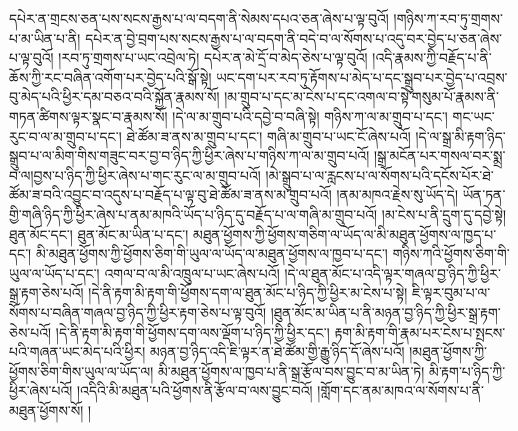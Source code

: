 དཔེར་ན་གྲངས་ཅན་པས་སངས་རྒྱས་པ་ལ་བདག་ནི་སེམས་དཔའ་ཅན་ཞེས་པ་ལྟ་བུའོ། །གཉིས་ཀ་རབ་ཏུ་གྲགས་པ་མ་ཡིན་པ་ནི། དཔེར་ན་བྱེ་བྲག་པས་སངས་རྒྱས་པ་ལ་བདག་ནི་བདེ་བ་ལ་སོགས་པ་འདུ་བར་བྱེད་པ་ཅན་ཞེས་པ་ལྟ་བུའོ། །རབ་ཏུ་གྲགས་པ་ཡང་འབྲེལ་ཏེ། དཔེར་ན་མེ་དྲོ་བ་མེད་ཅེས་པ་ལྟ་བུའོ། །འདི་རྣམས་ཀྱི་བརྗོད་པ་ནི་ཆོས་ཀྱི་རང་བཞིན་འགོག་པར་བྱེད་པའི་སྒོ་སྟེ། ཡང་དག་པར་རབ་ཏུ་རྟོགས་པ་མེད་པ་དང་སྒྲུབ་པར་བྱེད་པ་འབྲས་བུ་མེད་པའི་ཕྱིར་དམ་བཅའ་བའི་སྐྱོན་རྣམས་སོ། །མ་གྲུབ་པ་དང་མ་ངེས་པ་དང་འགལ་བ་སྟེ་གསུམ་པོ་རྣམས་ནི་གཏན་ཚིགས་ལྟར་སྣང་བ་རྣམས་སོ། །དེ་ལ་མ་གྲུབ་པའི་དབྱེ་བ་བཞི་སྟེ། གཉིས་ཀ་ལ་མ་གྲུབ་པ་དང་། གང་ཡང་རུང་བ་ལ་མ་གྲུབ་པ་དང་། ཐེ་ཚོམ་ཟ་ནས་མ་གྲུབ་པ་དང་། གཞི་མ་གྲུབ་པ་ཡང་ངོ་ཞེས་པའོ། །དེ་ལ་སྒྲ་མི་རྟག་ཉིད་སྒྲུབ་པ་ལ་མིག་གིས་གཟུང་བར་བྱ་བ་ཉིད་ཀྱི་ཕྱིར་ཞེས་པ་གཉིས་ཀ་ལ་མ་གྲུབ་པའོ། །སྒྲ་མངོན་པར་གསལ་བར་སྨྲ་བ་ལ།བྱས་པ་ཉིད་ཀྱི་ཕྱིར་ཞེས་པ་གང་རུང་ལ་མ་གྲུབ་པའོ། །མེ་སྒྲུབ་པ་ལ་རླངས་པ་ལ་སོགས་པའི་དངོས་པོར་ཐེ་ཚོམ་ཟ་བའི་འབྱུང་བ་འདུས་པ་བརྗོད་པ་ལྟ་བུ་ཐེ་ཚོམ་ཟ་ནས་མ་གྲུབ་པའོ། །ནམ་མཁའ་རྗེས་སུ་ཡོད་དེ། ཡོན་ཏན་གྱི་གཞི་ཉིད་ཀྱི་ཕྱིར་ཞེས་པ་ནམ་མཁའི་ཡོད་པ་ཉིད་དུ་བརྗོད་པ་ལ་གཞི་མ་གྲུབ་པའོ། །མ་ངེས་པ་ནི་དྲུག་དུ་དབྱེ་སྟེ། ཐུན་མོང་དང་། ཐུན་མོང་མ་ཡིན་པ་དང་། མཐུན་ཕྱོགས་ཀྱི་ཕྱོགས་གཅིག་ལ་ཡོད་ལ་མི་མཐུན་ཕྱོགས་ལ་ཁྱད་པ་དང་། མི་མཐུན་ཕྱོགས་ཀྱི་ཕྱོགས་ཅིག་གི་ཡུལ་ལ་ཡོད་ལ་མཐུན་ཕྱོགས་ལ་ཁྱབ་པ་དང་། གཉིས་ཀའི་ཕྱོགས་ཅིག་གི་ཡུལ་ལ་ཡོད་པ་དང་། འགལ་བ་ལ་མི་འཁྲུལ་པ་ཡང་ཞེས་པའོ། །དེ་ལ་ཐུན་མོང་པ་འདི་ལྟར་གཞལ་བྱ་ཉིད་ཀྱི་ཕྱིར་སྒྲ་རྟག་ཅེས་པའོ། །དེ་ནི་རྟག་མི་རྟག་གི་ཕྱོགས་དག་ལ་ཐུན་མོང་པ་ཉིད་ཀྱི་ཕྱིར་མ་ངེས་པ་སྟེ། ཇི་ལྟར་བུམ་པ་ལ་སོགས་པ་བཞིན་གཞལ་བྱ་ཉིད་ཀྱི་ཕྱིར་རྟག་ཅེས་པ་ལྟ་བུའོ། །ཐུན་མོང་མ་ཡིན་པ་ནི་མཉན་བྱ་ཉིད་ཀྱི་ཕྱིར་སྒྲ་རྟག་ཅེས་པའོ། །དེ་ནི་རྟག་མི་རྟག་གི་ཕྱོགས་དག་ལས་ལྡོག་པ་ཉིད་ཀྱི་ཕྱིར་དང་། རྟག་མི་རྟག་གི་རྣམ་པར་ངེས་པ་སྤངས་པའི་གཞན་ཡང་མེད་པའི་ཕྱིར། མཉན་བྱ་ཉིད་འདི་ཇི་ལྟར་ན་ཐེ་ཚོམ་གྱི་རྒྱུ་ཉིད་དོ་ཞེས་པའོ། །མཐུན་ཕྱོགས་ཀྱི་ཕྱོགས་ཅིག་གིས་ཡུལ་ལ་ཡོད་ལ། མི་མཐུན་ཕྱོགས་ལ་ཁྱབ་པ་ནི་སྒྲ་རྩོལ་བས་བྱུང་བ་མ་ཡིན་ཏེ། མི་རྟག་པ་ཉིད་ཀྱི་ཕྱིར་ཞེས་པའོ། །འདིའི་མི་མཐུན་པའི་ཕྱོགས་ནི་རྩོལ་བ་ལས་བྱུང་བའོ། །གློག་དང་ནམ་མཁའ་ལ་སོགས་པ་ནི་མཐུན་ཕྱོགས་སོ། །
